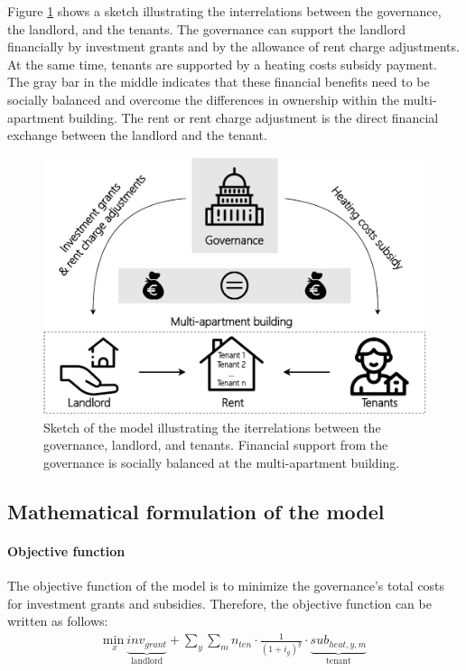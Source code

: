 Figure \ref{fig:methodology} shows a sketch illustrating the interrelations between the governance, the landlord, and the tenants. The governance can support the landlord financially by investment grants and by the allowance of rent charge adjustments. At the same time, tenants are supported by a heating costs subsidy payment. The gray bar in the middle indicates that these financial benefits need to be socially balanced and overcome the differences in ownership within the multi-apartment building. The rent or rent charge adjustment is the direct financial exchange between the landlord and the tenant.\vspace{0.5cm}

\begin{figure}[h]
	\centering
	\includegraphics[width=1\linewidth]{figures/3_Methodology/Sketch.pdf}
	\caption{Sketch of the model illustrating the iterrelations between the governance, landlord, and tenants. Financial support from the governance is socially balanced at the multi-apartment building.}
	\label{fig:methodology}
\end{figure}

\subsection{Mathematical formulation of the model}\label{met:formulas}
\paragraph{Objective function}
The objective function of the model is to minimize the governance's total costs for investment grants and subsidies. Therefore, the objective function can be written as follows: 
\begin{align}\label{objective}
\underset{x}{\mathrm{min~}} \underbrace{inv_{grant}}_\text{landlord} + \sum_{y} \sum_{m} n_{ten} \cdot \frac{1}{(1+i_g)^y} \cdot \underbrace{sub_{heat,y,m}}_\text{tenant}
\end{align}

